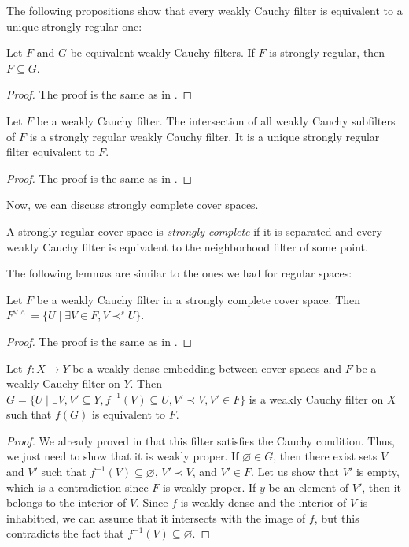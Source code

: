 \documentclass[reqno]{amsart}
\theoremstyle{definition}
\theoremstyle{remark}
\numberwithin{figure}{section}
\newcommand{\rb}{\prec}
\begin{document}
The following propositions show that every weakly Cauchy filter is equivalent to a unique strongly regular one:

\begin{prop}
Let $F$ and $G$ be equivalent weakly Cauchy filters.
If $F$ is strongly regular, then $F \subseteq G$.
\end{prop}
\begin{proof}
The proof is the same as in .
\end{proof}

\begin{prop}
Let $F$ be a weakly Cauchy filter.
The intersection of all weakly Cauchy subfilters of $F$ is a strongly regular weakly Cauchy filter.
It is a unique strongly regular filter equivalent to $F$.
\end{prop}
\begin{proof}
The proof is the same as in .
\end{proof}

Now, we can discuss strongly complete cover spaces.

\begin{defn}
A strongly regular cover space is \emph{strongly complete} if it is separated and every weakly Cauchy filter is equivalent to the neighborhood filter of some point.
\end{defn}

The following lemmas are similar to the ones we had for regular spaces:

\begin{lem}
Let $F$ be a weakly Cauchy filter in a strongly complete cover space.
Then $F^{\vee \wedge} = \{ U \mid \exists V \in F, V \rb^s U \}$.
\end{lem}
\begin{proof}
The proof is the same as in .
\end{proof}

\begin{lem}
Let $f : X \to Y$ be a weakly dense embedding between cover spaces and $F$ be a weakly Cauchy filter on $Y$.
Then $G = \{ U \mid \exists V,V' \subseteq Y, f^{-1}(V) \subseteq U, V' \rb V, V' \in F \}$ is a weakly Cauchy filter on $X$ such that $f(G)$ is equivalent to $F$.
\end{lem}
\begin{proof}
We already proved in  that this filter satisfies the Cauchy condition.
Thus, we just need to show that it is weakly proper.
If $\varnothing \in G$, then there exist sets $V$ and $V'$ such that $f^{-1}(V) \subseteq \varnothing$, $V' \rb V$, and $V' \in F$.
Let us show that $V'$ is empty, which is a contradiction since $F$ is weakly proper.
If $y$ be an element of $V'$, then it belongs to the interior of $V$.
Since $f$ is weakly dense and the interior of $V$ is inhabitted, we can assume that it intersects with the image of $f$, but this contradicts the fact that $f^{-1}(V) \subseteq \varnothing$.
\end{proof}
\end{document}
